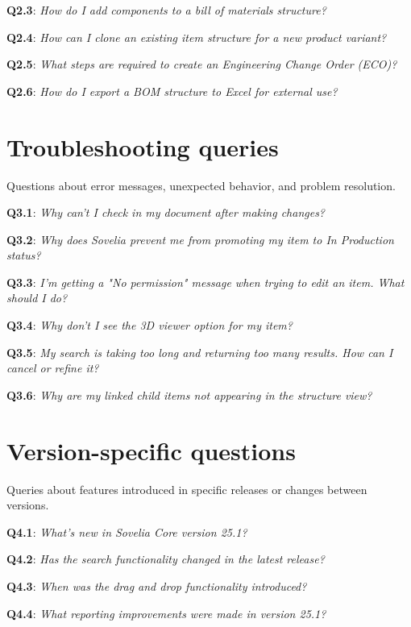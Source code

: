 \textbf{Q2.3}: \textit{How do I add components to a bill of materials structure?}

\textbf{Q2.4}: \textit{How can I clone an existing item structure for a new product variant?}

\textbf{Q2.5}: \textit{What steps are required to create an Engineering Change Order (ECO)?}

\textbf{Q2.6}: \textit{How do I export a BOM structure to Excel for external use?}

\section{Troubleshooting queries}
\label{app:category-troubleshooting-queries}

Questions about error messages, unexpected behavior, and problem resolution.

\textbf{Q3.1}: \textit{Why can't I check in my document after making changes?}

\textbf{Q3.2}: \textit{Why does Sovelia prevent me from promoting my item to In Production status?}

\textbf{Q3.3}: \textit{I'm getting a "No permission" message when trying to edit an item. What should I do?}

\textbf{Q3.4}: \textit{Why don't I see the 3D viewer option for my item?}

\textbf{Q3.5}: \textit{My search is taking too long and returning too many results. How can I cancel or refine it?}

\textbf{Q3.6}: \textit{Why are my linked child items not appearing in the structure view?}

\section{Version-specific questions}
\label{app:category-version-specific-questions}

Queries about features introduced in specific releases or changes between versions.

\textbf{Q4.1}: \textit{What's new in Sovelia Core version 25.1?}

\textbf{Q4.2}: \textit{Has the search functionality changed in the latest release?}

\textbf{Q4.3}: \textit{When was the drag and drop functionality introduced?}

\textbf{Q4.4}: \textit{What reporting improvements were made in version 25.1?}

